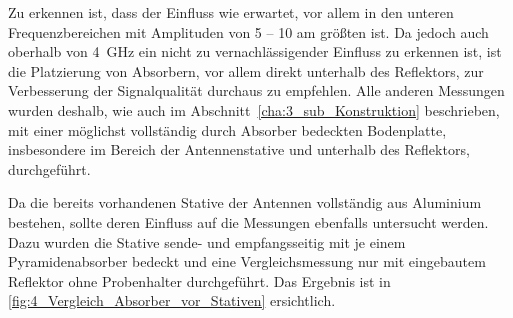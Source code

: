 Zu erkennen ist, dass der Einfluss wie erwartet, vor allem in den unteren Frequenzbereichen mit \mbox{Amplituden} von 5 -- \SI{10}{\Dezibel} am größten ist. Da jedoch auch oberhalb von \SI{4}{\giga\hertz} ein nicht zu vernachlässigender Einfluss zu erkennen ist, ist die Platzierung von Absorbern, vor allem direkt unterhalb des Reflektors, zur Verbesserung der Signalqualität durchaus zu empfehlen. Alle anderen Messungen wurden deshalb, wie auch im Abschnitt~\ref{cha:3_sub_Konstruktion} beschrieben, mit einer möglichst vollständig durch Absorber bedeckten Bodenplatte, insbesondere im Bereich der Antennenstative und unterhalb des Reflektors, durchgeführt.
\par
\vspace{\linespace}
Da die bereits vorhandenen Stative der Antennen vollständig aus Aluminium bestehen, sollte deren Einfluss auf die Messungen ebenfalls untersucht werden. Dazu wurden die Stative sende- und empfangsseitig mit je einem Pyramidenabsorber bedeckt und eine Vergleichsmessung nur mit eingebautem Reflektor ohne Probenhalter durchgeführt. Das Ergebnis ist in \Abb\ref{fig:4_Vergleich_Absorber_vor_Stativen} ersichtlich.
\par
\vspace{\linespace}



